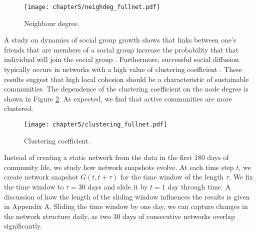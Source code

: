 \begin{figure}[!ht]
	\centering
	\texttt{[image: chapter5/neighdeg\_fullnet.pdf]}
	\caption{Neighbour degree.}
	\label{fig:fullneighdeg}
\end{figure}

A study on dynamics of social group growth shows that links between one’s friends that are members of a social group increase the probability that that individual will join the social group \cite{backstrom2006group}. Furthermore, successful social diffusion typically occurs in networks with a high value of clustering coefficient \cite{centola2007cascade}. These results suggest that high local cohesion should be a characteristic of sustainable communities. The dependence of the clustering coefficient on the node degree is shown in Figure \ref{fig:fullclustering}. As expected, we find that active communities are more clustered.

\begin{figure}[h]
	\centering
	\texttt{[image: chapter5/clustering\_fullnet.pdf]}
	\caption{Clustering coefficient.}
	\label{fig:fullclustering}
\end{figure}

Instead of creating a static network from the data in the first 180 days of community life, we study how network snapshots evolve. At each time step $t$, we create network snapshot $G(t, t+\tau)$ for the time window of the length $\tau$. We fix the time window to $\tau=30$ days and slide it by $t=1$ day through time. A discussion of how the length of the sliding window influences the results is given in Appendix A. Sliding the time window by one day, we can capture changes in the network structure daily, as two 30 days of consecutive networks overlap significantly. 

